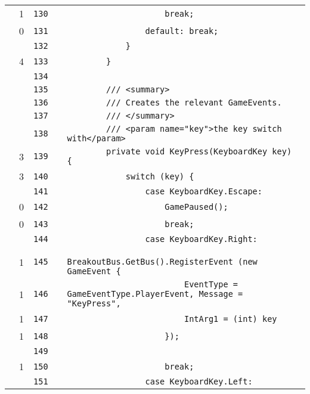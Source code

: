 \documentclass[a4paper,landscape,10pt]{article}
\begin{document}
\begin{longtable}[l]{lrrll}
\cellcolor{green} & 1 & \verb~130~ & & \verb~                    break;~\\
\cellcolor{red} & 0 & \verb~131~ & & \verb~                default: break;~\\
\cellcolor{gray} &  & \verb~132~ & & \verb~            }~\\
\cellcolor{green} & 4 & \verb~133~ & & \verb~        }~\\
\cellcolor{gray} &  & \verb~134~ & & \verb~~\\
\cellcolor{gray} &  & \verb~135~ & & \verb~        /// <summary>~\\
\cellcolor{gray} &  & \verb~136~ & & \verb~        /// Creates the relevant GameEvents.~\\
\cellcolor{gray} &  & \verb~137~ & & \verb~        /// </summary>~\\
\cellcolor{gray} &  & \verb~138~ & & \verb~        /// <param name="key">the key switch with</param>~\\
\cellcolor{green} & 3 & \verb~139~ & & \verb~        private void KeyPress(KeyboardKey key) {~\\
\cellcolor{orange} & 3 & \verb~140~ & & \verb~            switch (key) {~\\
\cellcolor{gray} &  & \verb~141~ & & \verb~                case KeyboardKey.Escape:~\\
\cellcolor{red} & 0 & \verb~142~ & & \verb~                    GamePaused();~\\
\cellcolor{red} & 0 & \verb~143~ & & \verb~                    break;~\\
\cellcolor{gray} &  & \verb~144~ & & \verb~                case KeyboardKey.Right:~\\
\cellcolor{green} & 1 & \verb~145~ & & \verb~                    BreakoutBus.GetBus().RegisterEvent (new GameEvent {~\\
\cellcolor{green} & 1 & \verb~146~ & & \verb~                        EventType = GameEventType.PlayerEvent, Message = "KeyPress",~\\
\cellcolor{green} & 1 & \verb~147~ & & \verb~                        IntArg1 = (int) key~\\
\cellcolor{green} & 1 & \verb~148~ & & \verb~                    });~\\
\cellcolor{gray} &  & \verb~149~ & & \verb~~\\
\cellcolor{green} & 1 & \verb~150~ & & \verb~                    break;~\\
\cellcolor{gray} &  & \verb~151~ & & \verb~                case KeyboardKey.Left:~\\

\end{longtable}
\end{document}
